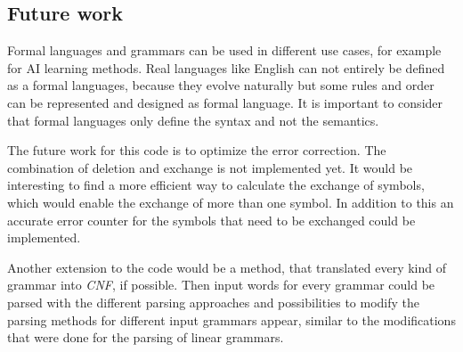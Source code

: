 \documentclass[a4paper, 11pt]{article}
\begin{document}
\subsection{Future work}

Formal languages and grammars can be used in different use cases, for example for AI learning methods. \cite{delahaye1987formal, rosenschein1985formal} Real languages like English can not entirely be defined as a formal languages, because they evolve naturally but some rules and order can be represented and designed as formal language. It is important to consider that formal languages only define the syntax and not the semantics. \cite{FG}

The future work for this code is to optimize the error correction. The combination of deletion and exchange is not implemented yet. It would be interesting to find a more efficient way to calculate the exchange of symbols, which would enable the exchange of more than one symbol.
In addition to this an accurate error counter for the symbols that need to be exchanged could be implemented.

Another extension to the code would be a method, that translated every kind of grammar into \textit{CNF}, if possible. Then input words for every grammar could be parsed with the different parsing approaches and possibilities to modify the parsing methods for different input grammars appear, similar to the modifications that were done for the parsing of linear grammars.




\newpage











\newpage

\fancyhead[LO]{\empty}
\end{document}
